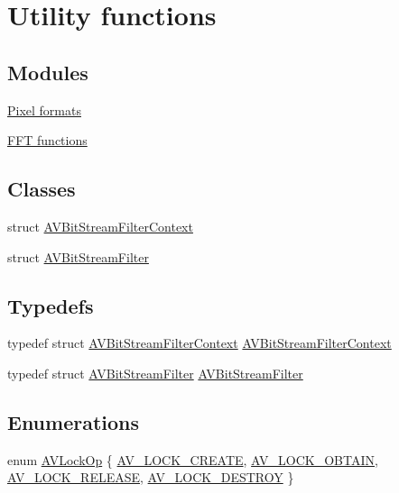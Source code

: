 \hypertarget{group__lavc__misc}{}\section{Utility functions}
\label{group__lavc__misc}
\subsection*{Modules}
\begin{DoxyCompactItemize}
\item 
\hyperlink{group__lavc__misc__pixfmt}{Pixel formats}
\item 
\hyperlink{group__lavc__fft}{F\+F\+T functions}
\end{DoxyCompactItemize}
\subsection*{Classes}
\begin{DoxyCompactItemize}
\item 
struct \hyperlink{struct_a_v_bit_stream_filter_context}{A\+V\+Bit\+Stream\+Filter\+Context}
\item 
struct \hyperlink{struct_a_v_bit_stream_filter}{A\+V\+Bit\+Stream\+Filter}
\end{DoxyCompactItemize}
\subsection*{Typedefs}
\begin{DoxyCompactItemize}
\item 
typedef struct \hyperlink{struct_a_v_bit_stream_filter_context}{A\+V\+Bit\+Stream\+Filter\+Context} \hyperlink{group__lavc__misc_ga2ab47771ac6385c834d0fb0bac71b609}{A\+V\+Bit\+Stream\+Filter\+Context}
\item 
typedef struct \hyperlink{struct_a_v_bit_stream_filter}{A\+V\+Bit\+Stream\+Filter} \hyperlink{group__lavc__misc_gaea3871dd20e820423b0abad16a7d0ac4}{A\+V\+Bit\+Stream\+Filter}
\end{DoxyCompactItemize}
\subsection*{Enumerations}
\begin{DoxyCompactItemize}
\item 
enum \hyperlink{group__lavc__misc_ga7a013315e444069ec9630ddf3edce3f8}{A\+V\+Lock\+Op} \{ \hyperlink{group__lavc__misc_gga7a013315e444069ec9630ddf3edce3f8a486a4a2d7a97554c2e073536c038465d}{A\+V\+\_\+\+L\+O\+C\+K\+\_\+\+C\+R\+E\+A\+TE}, 
\hyperlink{group__lavc__misc_gga7a013315e444069ec9630ddf3edce3f8af684bbd8575f2686f42346f5e43be673}{A\+V\+\_\+\+L\+O\+C\+K\+\_\+\+O\+B\+T\+A\+IN}, 
\hyperlink{group__lavc__misc_gga7a013315e444069ec9630ddf3edce3f8a7c470cd815cdef3b16a977e9a8c89c69}{A\+V\+\_\+\+L\+O\+C\+K\+\_\+\+R\+E\+L\+E\+A\+SE}, 
\hyperlink{group__lavc__misc_gga7a013315e444069ec9630ddf3edce3f8aee9ae55e2efe16565998e473c2a18935}{A\+V\+\_\+\+L\+O\+C\+K\+\_\+\+D\+E\+S\+T\+R\+OY}
 \}
\end{DoxyCompactItemize}
